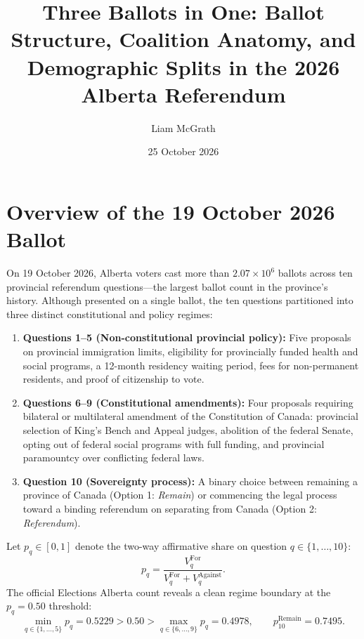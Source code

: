 \documentclass[11pt]{article}
\title{Three Ballots in One: Ballot Structure, Coalition Anatomy, and Demographic Splits in the 2026 Alberta Referendum}
\author{Liam McGrath}
\date{25 October 2026}
\begin{document}
\maketitle
\tableofcontents

\section{Overview of the 19 October 2026 Ballot}
\label{sec:ballot-overview}
On 19 October 2026, Alberta voters cast more than $2.07\times 10^6$ ballots across ten provincial referendum questions---the largest ballot count in the province's history. Although presented on a single ballot, the ten questions partitioned into three distinct constitutional and policy regimes:
\begin{enumerate}[label=\arabic*.]
\item \textbf{Questions 1--5 (Non-constitutional provincial policy):} Five proposals on provincial immigration limits, eligibility for provincially funded health and social programs, a 12-month residency waiting period, fees for non-permanent residents, and proof of citizenship to vote.
\item \textbf{Questions 6--9 (Constitutional amendments):} Four proposals requiring bilateral or multilateral amendment of the Constitution of Canada: provincial selection of King's Bench and Appeal judges, abolition of the federal Senate, opting out of federal social programs with full funding, and provincial paramountcy over conflicting federal laws.
\item \textbf{Question 10 (Sovereignty process):} A binary choice between remaining a province of Canada (Option 1: \textit{Remain}) or commencing the legal process toward a binding referendum on separating from Canada (Option 2: \textit{Referendum}).
\end{enumerate}

Let $p_q \in [0,1]$ denote the two-way affirmative share on question $q \in \{1,\dots,10\}$:
\begin{equation}
p_q = \frac{V_q^{\text{For}}}{V_q^{\text{For}} + V_q^{\text{Against}}}.
\label{eq:two-way-share}
\end{equation}
The official Elections Alberta count reveals a clean regime boundary at the $p_q = 0.50$ threshold:
\begin{equation}
\min_{q \in \{1,\dots,5\}} p_q = 0.5229 > 0.50 > \max_{q \in \{6,\dots,9\}} p_q = 0.4978, \qquad p_{10}^{\text{Remain}} = 0.7495.
\label{eq:regime-separation}
\end{equation}
\end{document}
